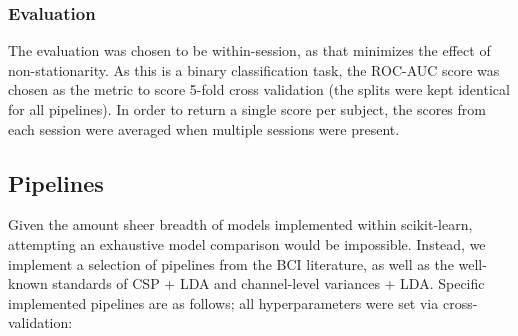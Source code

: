 \subsubsection{Evaluation}
The evaluation was chosen to be within-session, as that minimizes the
effect of non-stationarity. As this is a binary classification task,
the ROC-AUC score was chosen as the metric to score 5-fold cross
validation (the splits were kept identical for all pipelines). In
order to return a single score per subject, the scores from each
session were averaged when multiple sessions were present.

\subsection{Pipelines}

Given the amount sheer breadth of models implemented within scikit-learn,
attempting an exhaustive model comparison would be impossible. Instead, we
implement a selection of pipelines from the BCI literature, as well as the
well-known standards of CSP + LDA and channel-level variances + LDA. Specific
implemented pipelines are as follows; all hyperparameters were set via cross-validation:

